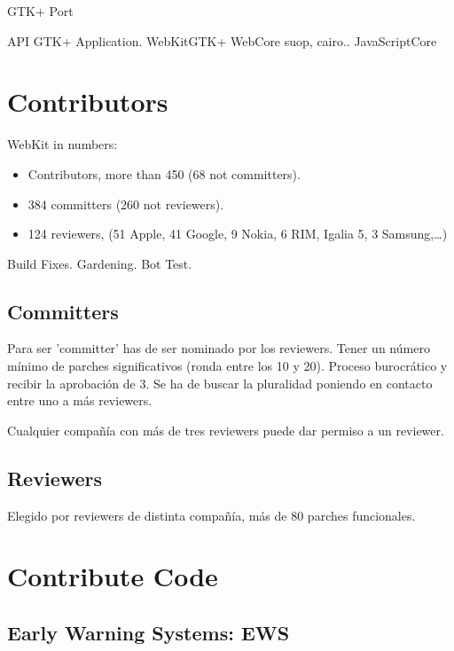 \documentclass[11pt]{scrartcl}
\begin{document}
GTK+ Port

API GTK+ Application.
WebKitGTK+
WebCore
suop, cairo.. JavaScriptCore


\section{Contributors}
\label{sec:contributors}

WebKit in numbers:
\begin{itemize}
	\item Contributors, more than 450 (68 not committers).
	\item 384 committers (260 not reviewers).
	\item 124 reviewers, (51 Apple, 41 Google, 9 Nokia, 6 RIM, Igalia 5, 3 Samsung,\ldots)
\end{itemize}

Build Fixes.
Gardening. Bot Test.

\subsection{Committers}
\label{sub:committers}

Para ser 'committer' has de ser nominado por los reviewers. Tener un número mínimo de parches significativos (ronda entre los 10 y 20). Proceso burocrático y recibir la aprobación de 3. Se ha de buscar la pluralidad poniendo en contacto entre uno a más reviewers.

Cualquier compañía con más de tres reviewers puede dar permiso a un reviewer.


\subsection{Reviewers}
\label{sub:reviewers}

Elegido por reviewers de distinta compañía, más de 80 parches funcionales.


\section{Contribute Code}
\label{sec:}

\subsection{Early Warning Systems: EWS}
\label{sub:ews}
\end{document}
